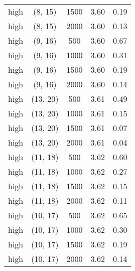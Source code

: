 \begin{tabular}{c c c c c}
high & (8, 15) &  1500 & 3.60 & 0.19 \\
high & (8, 15) &  2000 & 3.60 & 0.13 \\
high & (9, 16) &  500 & 3.60 & 0.67 \\
high & (9, 16) &  1000 & 3.60 & 0.31 \\
high & (9, 16) &  1500 & 3.60 & 0.19 \\
high & (9, 16) &  2000 & 3.60 & 0.14 \\
high & (13, 20) &  500 & 3.61 & 0.49 \\
high & (13, 20) &  1000 & 3.61 & 0.15 \\
high & (13, 20) &  1500 & 3.61 & 0.07 \\
high & (13, 20) &  2000 & 3.61 & 0.04 \\
high & (11, 18) &  500 & 3.62 & 0.60 \\
high & (11, 18) &  1000 & 3.62 & 0.27 \\
high & (11, 18) &  1500 & 3.62 & 0.15 \\
high & (11, 18) &  2000 & 3.62 & 0.11 \\
high & (10, 17) &  500 & 3.62 & 0.65 \\
high & (10, 17) &  1000 & 3.62 & 0.30 \\
high & (10, 17) &  1500 & 3.62 & 0.19 \\
high & (10, 17) &  2000 & 3.62 & 0.14 \\
\hline
\end{tabular}
